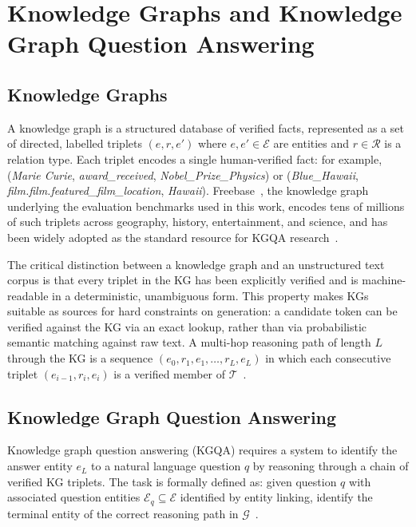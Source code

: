 \section{Knowledge Graphs and Knowledge Graph Question Answering}
\label{sec:kgqa}

\subsection{Knowledge Graphs}

A knowledge graph is a structured database of verified facts, represented as a set of directed, labelled triplets $(e, r, e')$ where $e, e' \in \mathcal{E}$ are entities and $r \in \mathcal{R}$ is a relation type. Each triplet encodes a single human-verified fact: for example, (\textit{Marie Curie}, \textit{award\_received}, \textit{Nobel\_Prize\_Physics}) or (\textit{Blue\_Hawaii}, \textit{film.film.featured\_film\_location}, \textit{Hawaii}). Freebase~\citep{bollacker2008freebase}, the knowledge graph underlying the evaluation benchmarks used in this work, encodes tens of millions of such triplets across geography, history, entertainment, and science, and has been widely adopted as the standard resource for KGQA research~\citep{yih2016websqp, talmor2018cwq}.

The critical distinction between a knowledge graph and an unstructured text corpus is that every triplet in the KG has been explicitly verified and is machine-readable in a deterministic, unambiguous form. This property makes KGs suitable as sources for hard constraints on generation: a candidate token can be verified against the KG via an exact lookup, rather than via probabilistic semantic matching against raw text. A multi-hop reasoning path of length $L$ through the KG is a sequence $(e_0, r_1, e_1, \ldots, r_L, e_L)$ in which each consecutive triplet $(e_{i-1}, r_i, e_i)$ is a verified member of $\mathcal{T}$~\citep{lan2022kgqa}.

\subsection{Knowledge Graph Question Answering}

Knowledge graph question answering (KGQA) requires a system to identify the answer entity $e_L$ to a natural language question $q$ by reasoning through a chain of verified KG triplets. The task is formally defined as: given question $q$ with associated question entities $\mathcal{E}_q \subseteq \mathcal{E}$ identified by entity linking, identify the terminal entity of the correct reasoning path in $\mathcal{G}$~\citep{lan2022kgqa}.

